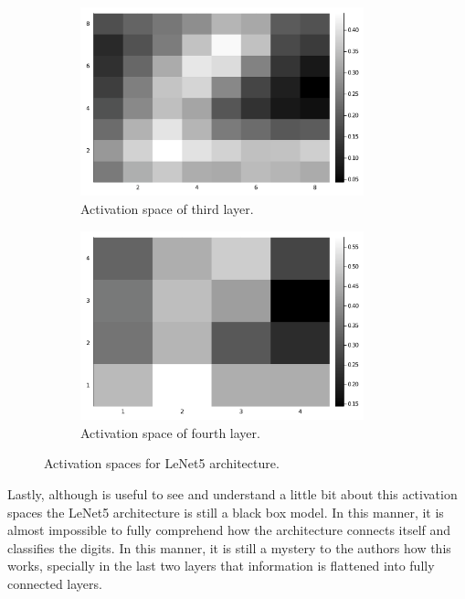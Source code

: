 \documentclass[conference]{IEEEtran}
\theoremstyle{definition}
\theoremstyle{remark}
\theoremstyle{remark}
\begin{document}
\begin{figure}
  \begin{subfigure}[b]{0.45\textwidth}
    \centering \includegraphics[width=0.9\textwidth]{figs/act-space-3.pdf}
    \caption{Activation space of third layer.}
  \end{subfigure}
  \begin{subfigure}[b]{0.45\textwidth}
    \centering \includegraphics[width=0.9\textwidth]{figs/act-space-4.pdf}
    \caption{Activation space of fourth layer.}
  \end{subfigure}
  \caption{Activation spaces for LeNet5 architecture.}
  \label{fig:lenet5-acts}
\end{figure}

Lastly, although is useful to see and understand a little bit about this
activation spaces the LeNet5 architecture is still a black box model. In this
manner, it is almost impossible to fully comprehend how the architecture
connects itself and classifies the digits. In this manner, it is still a mystery
to the authors how this works, specially in the last two layers that information
is flattened into fully connected layers.
\end{document}
